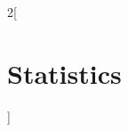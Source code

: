 \documentclass[../../../main.tex]{subfiles}
\begin{document}
\begin{multicols}{2}[\section{Statistics}]

\end{multicols}
\end{document}
